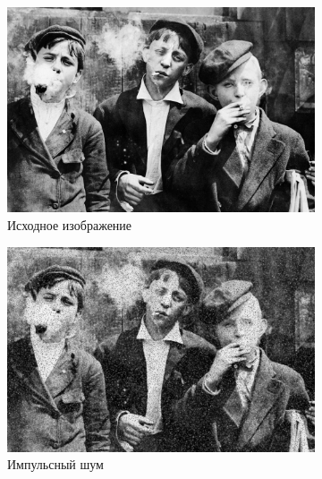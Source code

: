 \begin{figure}[ht!] 
    \centering
    \begin{subfigure}[b]{0.5\linewidth}
        \centering
        \includegraphics[width=0.95\linewidth]{../lewis-hine-taschen-main-3.jpg} 
        \caption{Исходное изображение} 
        \label{wiener_3:a} 
        \vspace{4ex}
    \end{subfigure}%
    \begin{subfigure}[b]{0.5\linewidth}
      \centering
      \includegraphics[width=0.95\linewidth]{../Wiener_Filter/Wiener_Impulse_noise_(k=3).jpg} 
      \caption{Импульсный шум} 
      \label{weiner_3:b} 
      \vspace{4ex}
    \end{subfigure}
    \begin{subfigure}[b]{0.5\linewidth}
      \centering

\end{subfigure}
\end{figure}
